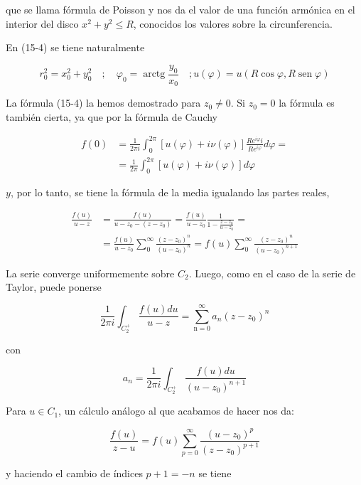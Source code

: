 \documentclass[10pt]{article}
\theoremstyle{plain}
\theoremstyle{definition}
\theoremstyle{remark}
\begin{document}
que se llama fórmula de Poisson y nos da el valor de una función armónica en el interior del disco $x^{2}+y^{2} \leqslant R$, conocidos los valores sobre la circunferencia.

En (15-4) se tiene naturalmente

$$
r_{0}^{2}=x_{0}^{2}+y_{0}^{2} \quad ; \quad \varphi_{0}=\operatorname{arctg} \frac{y_{0}}{x_{0}} \quad ; u(\varphi)=u(R \cos \varphi, R \operatorname{sen} \varphi)
$$

La fórmula (15-4) la hemos demostrado para $z_{0} \neq 0$. Si $z_{0}=0$ la fórmula es también cierta, ya que por la fórmula de Cauchy

$$
\begin{aligned}
f(0) & =\frac{1}{2 \pi i} \int_{0}^{2 \pi}[u(\varphi)+i \nu(\varphi)] \frac{R e^{i \varphi} i}{R e^{i \varphi}} d \varphi= \\
& =\frac{1}{2 \pi} \int_{0}^{2 \pi}[u(\varphi)+i \nu(\varphi)] d \varphi
\end{aligned}
$$

$y$, por lo tanto, se tiene la fórmula de la media igualando las partes reales,


$$
\begin{aligned}
\frac{f(u)}{u-z} & =\frac{f(u)}{u-z_{0}-\left(z-z_{0}\right)}=\frac{f(u)}{u-z_{0}} \frac{1}{1-\frac{z-z_{0}}{u-z_{0}}}= \\
& =\frac{f(u)}{u-z_{0}} \sum_{0}^{\infty} \frac{\left(z-z_{0}\right)^{n}}{\left(u-z_{0}\right)^{n}}=f(u) \sum_{0}^{\infty} \frac{\left(z-z_{0}\right)^{n}}{\left(u-z_{0}\right)^{n+1}}
\end{aligned}
$$

La serie converge uniformemente sobre $C_{2}$. Luego, como en el caso de la serie de Taylor, puede ponerse

$$
\frac{1}{2 \pi i} \int_{C_{2}^{+}} \frac{f(u) d u}{u-z}=\sum_{\mathrm{n}=0}^{\infty} a_{n}\left(z-z_{0}\right)^{n}
$$

con


\begin{equation*}
a_{n}=\frac{1}{2 \pi i} \int_{C_{2}^{+}} \frac{f(u) d u}{\left(u-z_{0}\right)^{n+1}} \tag{16-2}
\end{equation*}


Para $u \in C_{1}$, un cálculo análogo al que acabamos de hacer nos da:

$$
\frac{f(u)}{z-u}=f(u) \sum_{p=0}^{\infty} \frac{\left(u-z_{0}\right)^{p}}{\left(z-z_{0}\right)^{p+1}}
$$

y haciendo el cambio de índices $p+1=-n$ se tiene
\end{document}
